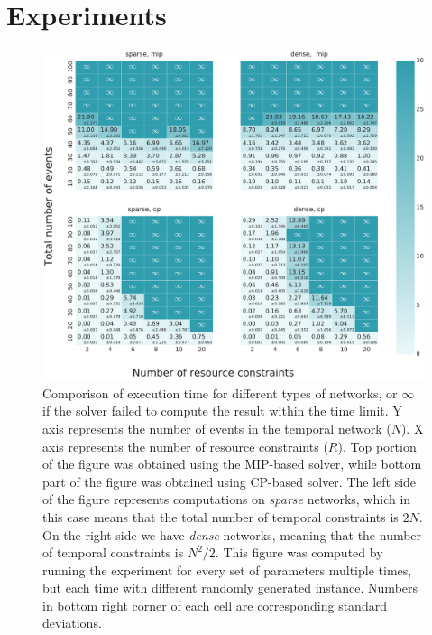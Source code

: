\section{Experiments}

\begin{figure}
\begin{center}
\includegraphics[width=\textwidth]{execution_time_std}
\caption{Comporison of execution time for different types of networks, or $\infty$ if the solver failed to compute the result within the time limit. Y axis represents the number of events in the temporal network ($N$). X axis represents the number of resource constraints ($R$). Top portion of the figure was obtained using the MIP-based solver, while bottom part of the figure was obtained using CP-based solver. The left side of the figure represents computations on \textit{sparse} networks, which in this case means that the total number of temporal constraints is $2N$. On the right side we have \textit{dense} networks, meaning that the number of temporal constraints is $N^2/2$. This figure was computed by running the experiment for every set of parameters multiple times, but each time with different randomly generated instance. Numbers in bottom right corner of each cell are corresponding standard deviations.}
\label{fig:execution_time}
\end{center}
\end{figure}

